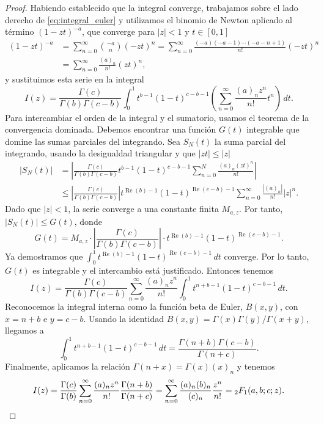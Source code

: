 \documentclass[12pt,a4paper]{book}
\renewcommand{\Re}{\operatorname{Re}}
\begin{document}
\begin{proof}
Habiendo establecido que la integral converge, trabajamos sobre el lado derecho de \eqref{eq:integral_euler} y utilizamos el binomio de Newton aplicado al término $(1-zt)^{-a}$, que converge para $|z|<1$ y $t \in [0,1]$
\begin{align*}
 (1-zt)^{-a} &= \sum_{n=0}^\infty \binom{-a}{n} (-zt)^n = 
 \sum_{n=0}^\infty \frac{(-a)(-a-1) \cdots (-a-n+1)}{n!} (-zt)^n \\ &= 
 \sum_{n=0}^\infty \frac{(a)_n}{n!} (zt)^n, 
\end{align*}
y sustituimos esta serie en la integral
\[ 
I(z) = \frac{\Gamma(c)}{\Gamma(b)\Gamma(c-b)} \int_0^1 t^{b-1} (1-t)^{c-b-1} \left( \sum_{n=0}^\infty \frac{(a)_n z^n}{n!} t^n \right) \, dt. 
\]
Para intercambiar el orden de la integral y el sumatorio, usamos el teorema de la convergencia dominada. Debemos encontrar una función $G(t)$ integrable que domine las sumas parciales del integrando. Sea $S_N(t)$ la suma parcial del integrando, usando la desigualdad triangular y que $|zt| \le |z|$
\begin{align*}
 |S_N(t)| &= \left| \frac{\Gamma(c)}{\Gamma(b)\Gamma(c-b)} t^{b-1} (1-t)^{c-b-1} \sum_{n=0}^N \frac{(a)_n (zt)^n}{n!} \right| \\ &\le \left| \frac{\Gamma(c)}{\Gamma(b)\Gamma(c-b)} \right| t^{\Re(b)-1} (1-t)^{\Re(c-b)-1}  \sum_{n=0}^\infty  \frac{|(a)_n|}{n!} |z|^n .
\end{align*}
Dado que $|z|<1$, la serie converge a una constante finita $M_{a,z}$. Por tanto, $|S_N(t)| \le G(t)$, donde
\[ 
G(t) = M_{a,z} \cdot \left| \frac{\Gamma(c)}{\Gamma(b)\Gamma(c-b)} \right| \cdot t^{\Re(b)-1} (1-t)^{\Re(c-b)-1}.
\]
Ya demostramos que $\int_0^1 t^{\Re(b)-1} (1-t)^{\Re(c-b)-1} \, dt$ converge. Por lo tanto, $G(t)$ es integrable y el intercambio está justificado. Entonces tenemos
\[ 
I(z) = \frac{\Gamma(c)}{\Gamma(b)\Gamma(c-b)} \sum_{n=0}^\infty  \frac{(a)_n z^n}{n!}  \int_0^1 t^{n+b-1} (1-t)^{c-b-1} \, dt.
\]
Reconocemos la integral interna como la función beta de Euler, $B(x,y)$, con $x = n+b$ e $y = c-b$. Usando la identidad $B(x,y) = \Gamma(x)\Gamma(y)/\Gamma(x+y)$, llegamos a
\[ 
\int_0^1 t^{n+b-1} (1-t)^{c-b-1} \, dt = \frac{\Gamma(n+b)\Gamma(c-b)}{\Gamma(n+c)}.
\]
Finalmente, aplicamos la relación $\Gamma(n+x) = \Gamma(x)(x)_n$ y tenemos
\[ 
I(z) = \frac{\Gamma(c)}{\Gamma(b)} \sum_{n=0}^\infty \frac{(a)_n z^n}{n!} \frac{\Gamma(n+b)}{\Gamma(n+c)} = \sum_{n=0}^\infty \frac{(a)_n (b)_n}{(c)_n} \frac{z^n}{n!} = {}_{2}F_{1}(a,b;c;z).
\qedhere
\]
\end{proof}
\end{document}
